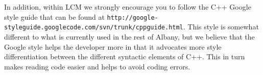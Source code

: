 \documentclass[10pt,a4paper]{article} \usepackage[utf8]{inputenc}
\begin{document}
In addition, within LCM we strongly encourage you to follow the C++
Google style guide that can be found at
\verb+http://google-styleguide.googlecode.com/svn/trunk/cppguide.html+. This
style is somewhat different to what is currently used in the rest of
Albany, but we believe that the Google style helps the developer more
in that it advocates more style differentiation between the different
syntactic elements of C++. This in turn makes reading code easier and
helps to avoid coding errors.
\end{document}
